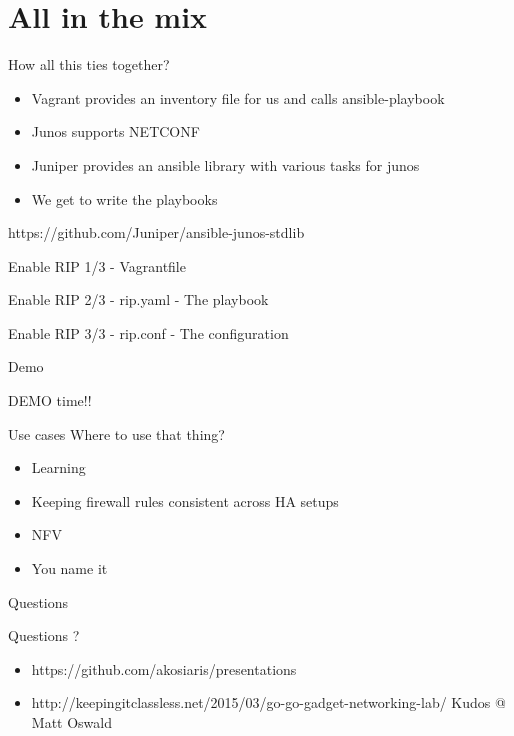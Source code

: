 \documentclass[aspectratio=1610]{beamer}
\begin{document}
\section{All in the mix}
    \begin{frame}{How all this ties together?}
        \begin{itemize}
            \pause \item Vagrant provides an inventory file for us and calls ansible-playbook
            \pause \item Junos supports NETCONF
	    \pause \item Juniper provides an ansible library with various tasks for junos
            \pause \item We get to write the playbooks
        \end{itemize}
	\pause https://github.com/Juniper/ansible-junos-stdlib
    \end{frame}
    \begin{frame}{Enable RIP 1/3 - Vagrantfile}
        
    \end{frame}
    \begin{frame}{Enable RIP 2/3 - rip.yaml - The playbook}
        
    \end{frame}
    \begin{frame}{Enable RIP 3/3 - rip.conf - The configuration}
        
    \end{frame}
    \begin{frame}{Demo}
        \begin{center}
            \Huge DEMO time!!
        \end{center}
    \end{frame}
    \begin{frame}{Use cases}
        Where to use that thing?
        \begin{itemize}
            \pause \item Learning
            \pause \item Keeping firewall rules consistent across HA setups
            \pause \item NFV
            \pause \item You name it
        \end{itemize}
    \end{frame}
    \begin{frame}{Questions}
        \begin{center}
            \Huge Questions ?
        \end{center}
	\begin{itemize}
	    \item https://github.com/akosiaris/presentations
	    \item http://keepingitclassless.net/2015/03/go-go-gadget-networking-lab/ Kudos @ Matt Oswald
	\end{itemize}
    \end{frame}
\end{document}
